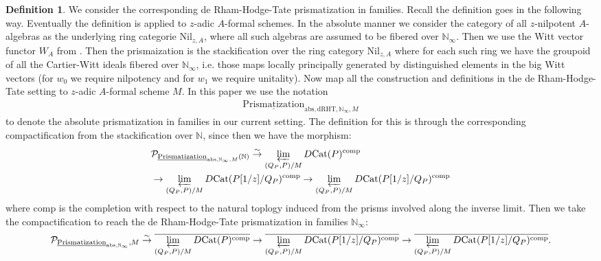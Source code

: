 \documentclass[12pt]{article}
\theoremstyle{definition}
\newtheorem{definition}{Definition}
\begin{document}
\begin{definition}
We consider the corresponding de Rham-Hodge-Tate prismatization in families. Recall the definition goes in the following way. Eventually the definition is applied to $z$-adic $A$-formal schemes. In the absolute manner we consider the category of all $z$-nilpotent $A$-algebras as the underlying ring categorie $\mathrm{Nil}_{z,A}$, where all such algebras are assumed to be fibered over $\mathbb{N}_\infty$. Then we use the Witt vector functor $W_A$ from \cite{3LH}. Then the prismaization is the stackification over the ring category $\mathrm{Nil}_{z,A}$ where for each such ring we have the groupoid of all the Cartier-Witt ideals fibered over $\mathbb{N}_\infty$, i.e. those maps locally principally generated by distinguished elements in the big Witt vectors (for $w_0$ we require nilpotency and for $w_1$ we require unitality). Now map all the construction and definitions in the de Rham-Hodge-Tate setting to $z$-adic $A$-formal scheme $M$. In this paper we use the notation 
\begin{align}
\underline{\mathrm{Prismatization}}_{\mathrm{abs},\mathrm{dRHT},\mathbb{N}_\infty,M}
\end{align}
to denote the absolute prismatization in families in our current setting. The definition for this is through the corresponding compactification from the stackification over $\mathbb{N}$, since then we have the morphism:
\begin{align}
&\mathcal{P}_{\underline{\mathrm{Prismatization}}_{\mathrm{abs},\mathbb{N}_\infty,M}(\mathbb{N})} \overset{\sim}{\rightarrow} \varprojlim_{(Q_P,P)/M} D\mathrm{Cat}(P)^\mathrm{comp}\\
&\rightarrow \varprojlim_{(Q_P,P)/M} D\mathrm{Cat}(P[1/z]/{Q_P})^\mathrm{comp}\rightarrow \varprojlim_{(Q_P,P)/M} D\mathrm{Cat}(P[1/z]/{Q_P})^\mathrm{comp}
\end{align}
where $\mathrm{comp}$ is the completion with respect to the natural toplogy induced from the prisms involved along the inverse limit. Then we take the compactification to reach the de Rham-Hodge-Tate prismatization in families $\mathbb{N}_\infty$:
\begin{align}
\mathcal{P}_{\underline{\mathrm{Prismatization}}_{\mathrm{abs},\mathbb{N}_\infty},M} \overset{\sim}{\rightarrow} \overline{\varprojlim_{(Q_P,P)/M} D\mathrm{Cat}(P)^\mathrm{comp}}
\rightarrow \overline{\varprojlim_{(Q_P,P)/M} D\mathrm{Cat}(P[1/z]/{Q_P})^\mathrm{comp}}\rightarrow \overline{\varprojlim_{(Q_P,P)/M} D\mathrm{Cat}(P[1/z]/{Q_P})^\mathrm{comp}}.
\end{align}

\end{definition}
\end{document}
